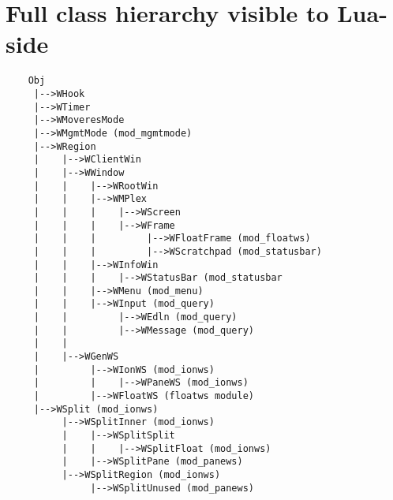 \chapter{Full class hierarchy visible to Lua-side}

{\small
\begin{verbatim}
    Obj
     |-->WHook
     |-->WTimer
     |-->WMoveresMode
     |-->WMgmtMode (mod_mgmtmode)
     |-->WRegion
     |    |-->WClientWin
     |    |-->WWindow
     |    |    |-->WRootWin
     |    |    |-->WMPlex
     |    |    |    |-->WScreen
     |    |    |    |-->WFrame
     |    |    |         |-->WFloatFrame (mod_floatws)
     |    |    |         |-->WScratchpad (mod_statusbar)
     |    |    |-->WInfoWin
     |    |    |    |-->WStatusBar (mod_statusbar
     |    |    |-->WMenu (mod_menu)
     |    |    |-->WInput (mod_query)
     |    |         |-->WEdln (mod_query)
     |    |         |-->WMessage (mod_query)
     |    |
     |    |-->WGenWS
     |         |-->WIonWS (mod_ionws)
     |         |    |-->WPaneWS (mod_ionws)
     |         |-->WFloatWS (floatws module)
     |-->WSplit (mod_ionws)
          |-->WSplitInner (mod_ionws)
          |    |-->WSplitSplit
          |    |    |-->WSplitFloat (mod_ionws)
          |    |-->WSplitPane (mod_panews)
          |-->WSplitRegion (mod_ionws)
               |-->WSplitUnused (mod_panews)
\end{verbatim}
}
